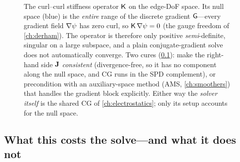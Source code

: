 \begin{figure}[t]
\centering
{}
\caption[The curl--curl gradient null space]{The curl--curl stiffness operator
$\mathsf{K}$ on the edge-DoF space. Its null space (blue) is the \emph{entire} range of
the discrete gradient $\mathsf{G}$---every gradient field $\nabla\psi$ has zero curl, so
$\mathsf{K}\,\nabla\psi=0$ (the gauge freedom of \cref{ch:derham}). The operator is
therefore only positive \emph{semi}-definite, singular on a large subspace, and a
plain conjugate-gradient solve does not automatically converge. Two cures
(\cref{sec:solvecare}): make the right-hand side $\mathbf{J}$ \emph{consistent}
(divergence-free, so it has no component along the null space, and CG runs in the
SPD complement), or precondition with an auxiliary-space method (AMS,
\cref{ch:smoothers}) that handles the gradient block explicitly. Either way the
\emph{solver itself} is the shared CG of \cref{ch:electrostatics}; only its setup
accounts for the null space.}
\label{fig:curlcurl-null}
\end{figure}

\subsection{What this costs the solve---and what it does not}
\label{sec:solvecare}

